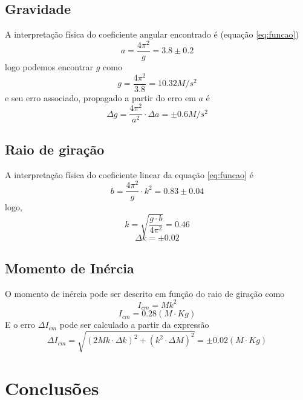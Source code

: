 \documentclass[12pt,a4paper]{article}
\begin{document}
\subsection{Gravidade}
A interpretação física do coeficiente angular encontrado é (equação \ref{eq:funcao})
 $$ a = \frac{4\pi^2}{g} = 3.8 \pm 0.2$$
  logo podemos encontrar $g$ como 
  $$ g = \frac{4\pi^2}{3.8} = 10.32 M/s^2 $$ 
  e seu erro associado, propagado a partir do erro em $a$ é
  $$ \Delta g = \frac{4\pi^2}{a^2} \cdot \Delta a = \pm 0.6 M/s^2 $$
  
\subsection{Raio de giração}

A interpretação física do coeficiente linear da equação \ref{eq:funcao} é 
$$ b = \frac{4\pi^2}{g} \cdot k^2 = 0.83 \pm 0.04 $$
logo, 
$$ k = \sqrt{\frac{g \cdot b}{4\pi^2}} = 0.46 $$
$$ \Delta k = \pm 0.02 $$

\subsection{Momento de Inércia}
O momento de inércia pode ser descrito em função do raio de giração como 
$$ I_{cm}  = Mk^2 $$
$$ I_{cm}  = 0.28 (M \cdot Kg)$$
E o erro $ \Delta I_{cm}$ pode ser calculado a partir da expressão 
$$\Delta I_{cm}  =\sqrt{(2Mk \cdot \Delta k)^2 + (k^2 \cdot \Delta M)^2} = \pm 0.02 (M \cdot Kg) $$

\section{Conclusões}
\end{document}
